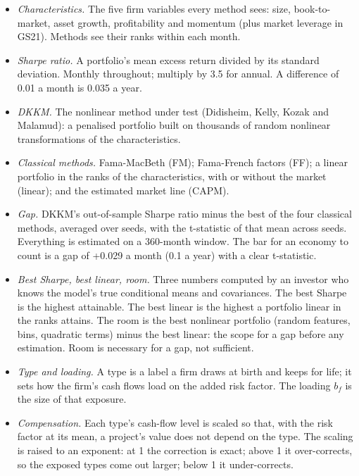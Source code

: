 \documentclass[11pt]{article}
\begin{document}
\begin{itemize}
\item \emph{Characteristics.} The five firm variables every method sees: size, book-to-market, asset growth, profitability and momentum (plus market leverage in GS21). Methods see their ranks within each month.
\item \emph{Sharpe ratio.} A portfolio's mean excess return divided by its standard deviation. Monthly throughout; multiply by 3.5 for annual. A difference of 0.01 a month is 0.035 a year.
\item \emph{DKKM.} The nonlinear method under test (Didisheim, Kelly, Kozak and Malamud): a penalised portfolio built on thousands of random nonlinear transformations of the characteristics.
\item \emph{Classical methods.} Fama-MacBeth (FM); Fama-French factors (FF); a linear portfolio in the ranks of the characteristics, with or without the market (linear); and the estimated market line (CAPM).
\item \emph{Gap.} DKKM's out-of-sample Sharpe ratio minus the best of the four classical methods, averaged over seeds, with the t-statistic of that mean across seeds. Everything is estimated on a 360-month window. The bar for an economy to count is a gap of +0.029 a month (0.1 a year) with a clear t-statistic.
\item \emph{Best Sharpe, best linear, room.} Three numbers computed by an investor who knows the model's true conditional means and covariances. The best Sharpe is the highest attainable. The best linear is the highest a portfolio linear in the ranks attains. The room is the best nonlinear portfolio (random features, bins, quadratic terms) minus the best linear: the scope for a gap before any estimation. Room is necessary for a gap, not sufficient.
\item \emph{Type and loading.} A type is a label a firm draws at birth and keeps for life; it sets how the firm's cash flows load on the added risk factor. The loading $b_f$ is the size of that exposure.
\item \emph{Compensation.} Each type's cash-flow level is scaled so that, with the risk factor at its mean, a project's value does not depend on the type. The scaling is raised to an exponent: at 1 the correction is exact; above 1 it over-corrects, so the exposed types come out larger; below 1 it under-corrects.
\end{itemize}
\end{document}
